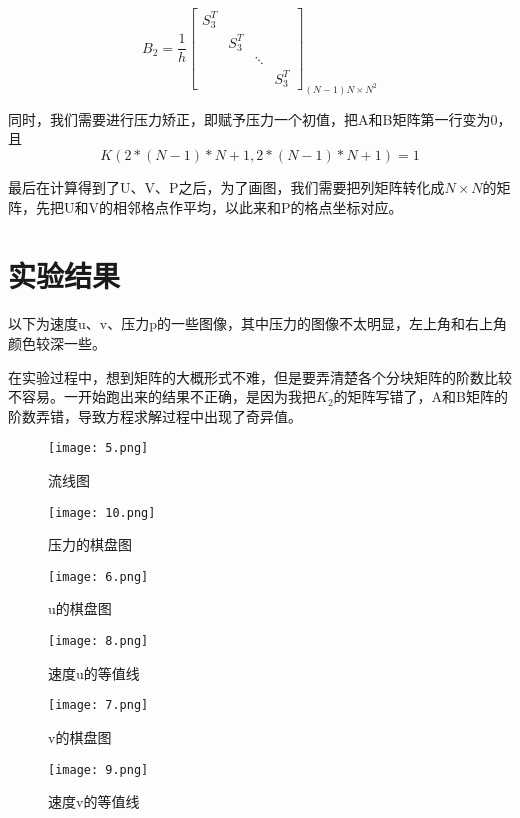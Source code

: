 \documentclass{article}
\begin{document}
\begin{equation*}
B_2=\frac{1}{h}	\begin{bmatrix}
		S_3^T &  &  & \\ 
		&  S_3^T& & \\ 
		&  &  \ddots& \\ 
		& & &S_3^T
	\end{bmatrix}_{(N-1)N\times N^2}
\end{equation*}

同时，我们需要进行压力矫正，即赋予压力一个初值，把A和B矩阵第一行变为0，且\begin{equation*}
	K(2*(N-1)*N+1,2*(N-1)*N+1)=1
\end{equation*}

最后在计算得到了U、V、P之后，为了画图，我们需要把列矩阵转化成$N \times N$的矩阵，先把U和V的相邻格点作平均，以此来和P的格点坐标对应。

\section{实验结果}
以下为速度u、v、压力p的一些图像，其中压力的图像不太明显，左上角和右上角颜色较深一些。

在实验过程中，想到矩阵的大概形式不难，但是要弄清楚各个分块矩阵的阶数比较不容易。一开始跑出来的结果不正确，是因为我把$K_2$的矩阵写错了，A和B矩阵的阶数弄错，导致方程求解过程中出现了奇异值。
\begin{figure}[htbp]
	\centering
	\begin{minipage}{0.49\linewidth}
		\centering
		\texttt{[image: 5.png]}
		\caption{流线图}
	\end{minipage}
	\begin{minipage}{0.49\linewidth}
		\centering
		\texttt{[image: 10.png]}	
		\caption{压力的棋盘图}	
	\end{minipage}
\end{figure}
\begin{figure}[htbp]
	\centering
	\begin{minipage}{0.49\linewidth}
		\centering
		\texttt{[image: 6.png]}
		\caption{u的棋盘图}
	\end{minipage}
	\begin{minipage}{0.49\linewidth}
		\centering
		\texttt{[image: 8.png]}
		\caption{速度u的等值线}		
	\end{minipage}
\end{figure}
\begin{figure}[htbp]
	\centering
	\begin{minipage}{0.49\linewidth}
		\centering
		\texttt{[image: 7.png]}
		\caption{v的棋盘图}
	\end{minipage}
	\begin{minipage}{0.49\linewidth}
		\centering
		\texttt{[image: 9.png]}
		\caption{速度v的等值线}		
	\end{minipage}
\end{figure}
\end{document}
